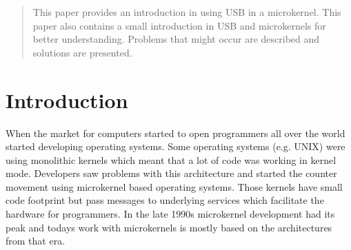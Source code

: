 \documentclass{acm_proc_article-sp}
\begin{document}
\maketitle
\begin{abstract}
This paper provides an introduction in using USB in a microkernel.
This paper also contains a small introduction in USB and microkernels for better understanding. Problems that might occur are described and solutions are presented.


\end{abstract}



\section{Introduction}
When the market for computers started to open programmers all over the world started developing
operating systems.
Some operating systems (e.g. UNIX) were using monolithic kernels which meant that a lot of code
was working in kernel mode.
Developers saw problems with this architecture and started the counter movement using microkernel
based operating systems.
Those kernels have small code footprint but pass messages to underlying services which facilitate
the hardware for programmers.
In the late 1990s microkernel development had its peak and todays work with microkernels is mostly
based on the architectures from that era.
\end{document}
